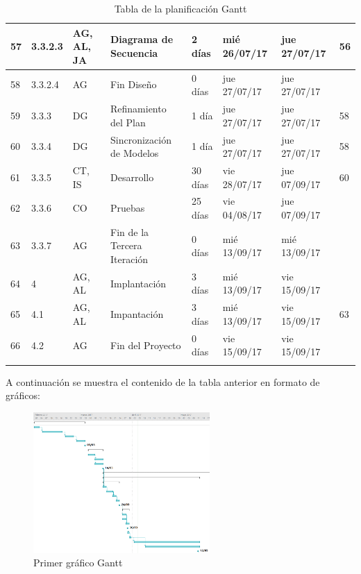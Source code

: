 \begin{center}
\begin{longtable}{  p{0.5cm}  p{1cm}  p{2cm}  p{4cm}  p{1.5cm}  p{2cm}  p{2cm}  p{2cm}  }
57	&	3.3.2.3	&	AG, AL, JA	&	         Diagrama de Secuencia	&	2 días	&	mié 26/07/17	&	jue 27/07/17	&	56	\\ \hline
58	&	3.3.2.4	&	AG	&	         Fin Diseño	&	0 días	&	jue 27/07/17	&	jue 27/07/17	&		\\ \hline
59	&	3.3.3	&	DG	&	      Refinamiento del Plan	&	1 día	&	jue 27/07/17	&	jue 27/07/17	&	58	\\ \hline
60	&	3.3.4	&	DG	&	      Sincronización de Modelos	&	1 día	&	jue 27/07/17	&	jue 27/07/17	&	58	\\ \hline
61	&	3.3.5	&	CT, IS	&	      Desarrollo	&	30 días	&	vie 28/07/17	&	jue 07/09/17	&	60	\\ \hline
62	&	3.3.6	&	CO	&	      Pruebas	&	25 días	&	vie 04/08/17	&	jue 07/09/17	&		\\ \hline
63	&	3.3.7	&	AG	&	      Fin de la Tercera Iteración	&	0 días	&	mié 13/09/17	&	mié 13/09/17	&		\\ \hline
64	&	4	&	AG, AL	&	Implantación	&	3 días	&	mié 13/09/17	&	vie 15/09/17	&		\\ \hline
65	&	4.1	&	AG, AL	&	   Impantación	&	3 días	&	mié 13/09/17	&	vie 15/09/17	&	63	\\ \hline
66	&	4.2	&	AG	&	   Fin del Proyecto	&	0 días	&	vie 15/09/17	&	vie 15/09/17	&		\\ \hline
  \caption{Tabla de la planificación Gantt}
  \label{tab:tablagantt}
\end{longtable}
\end{center}

\par A continuación se muestra el contenido de la tabla anterior en formato de gráficos:
\begin{figure}[h]
\begin{center}
\includegraphics[width=0.6\textwidth]{./img/Gantt1.png}
\end{center}
\caption{Primer gráfico Gantt}
\label{tab:gantt1}
\end{figure}

